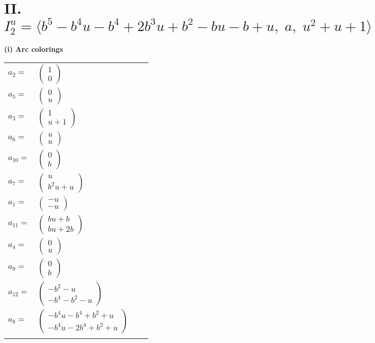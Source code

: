 \documentclass[1p]{elsarticle_modified}
\theoremstyle{definition}
\begin{document}
\centering \section*{II. $I^u_{2}= \langle b^5- b^4 u- b^4+2 b^3 u+b^2- b u- b+u,\;a,\;u^2+u+1 \rangle$}
\flushleft \textbf{(i) Arc colorings}\\
\begin{tabular}{m{7pt} m{180pt} m{7pt} m{180pt} }
\flushright $a_{2}=$&$\begin{pmatrix}1\\0\end{pmatrix}$ \\
\flushright $a_{5}=$&$\begin{pmatrix}0\\u\end{pmatrix}$ \\
\flushright $a_{3}=$&$\begin{pmatrix}1\\u+1\end{pmatrix}$ \\
\flushright $a_{6}=$&$\begin{pmatrix}u\\u\end{pmatrix}$ \\
\flushright $a_{10}=$&$\begin{pmatrix}0\\b\end{pmatrix}$ \\
\flushright $a_{7}=$&$\begin{pmatrix}u\\b^2 u+u\end{pmatrix}$ \\
\flushright $a_{1}=$&$\begin{pmatrix}- u\\- u\end{pmatrix}$ \\
\flushright $a_{11}=$&$\begin{pmatrix}b u+b\\b u+2 b\end{pmatrix}$ \\
\flushright $a_{4}=$&$\begin{pmatrix}0\\u\end{pmatrix}$ \\
\flushright $a_{9}=$&$\begin{pmatrix}0\\b\end{pmatrix}$ \\
\flushright $a_{12}=$&$\begin{pmatrix}- b^2- u\\- b^4- b^2- u\end{pmatrix}$ \\
\flushright $a_{8}=$&$\begin{pmatrix}- b^4 u- b^4+b^2+u\\- b^4 u-2 b^4+b^2+u\end{pmatrix}$\\&\end{tabular}
\end{document}

